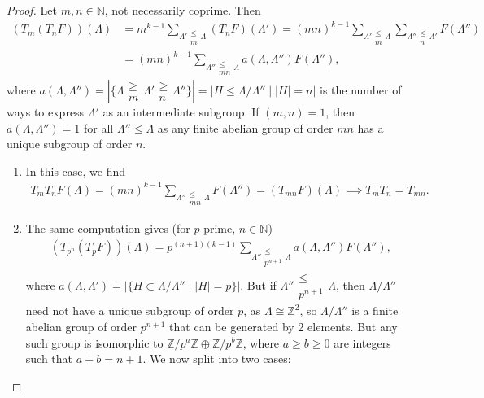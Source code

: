 \documentclass{article}
\theoremstyle{definition}
\begin{document}
\begin{proof}
    Let $m,n \in \mathbb{N}$, not necessarily coprime. Then 
    \begin{align*}
        (T_m(T_nF))(\Lambda) &= m^{k-1}\sum_{\Lambda' \substack{\le  \\ m} \Lambda}(T_nF)(\Lambda') = (mn)^{k-1}\sum_{\Lambda' \substack{\le  \\ m} \Lambda}\sum_{\Lambda'' \substack{\le  \\ n} \Lambda'} F(\Lambda'') \\
        &=(mn)^{k-1} \sum_{\Lambda'' \substack{\le  \\ mn} \Lambda}a(\Lambda,\Lambda'')F(\Lambda''),
    \end{align*}
    where $a(\Lambda, \Lambda'') = |\{\Lambda \substack{\ge \\ m} \Lambda' \substack{\ge \\ n} \Lambda''\}| = |H \le \Lambda/\Lambda'' \mid |H| = n|$ is the number of ways to express $\Lambda'$ as an intermediate subgroup. If $(m,n) = 1$, then $a(\Lambda,\Lambda'') = 1$ for all $\Lambda'' \le \Lambda$ as any finite abelian group of order $mn$ has a unique subgroup of order $n$.
    \begin{enumerate}[(1)]
        \item In this case, we find 
        \begin{align*}
            T_m T_nF(\Lambda) = (mn)^{k-1} \sum_{\Lambda'' \substack{\le  \\ mn} \Lambda} F(\Lambda'') = (T_{mn}F)(\Lambda) \implies T_mT_n = T_{mn}.
        \end{align*}
        \item The same computation gives (for $p$ prime, $n \in \mathbb{N}$)
        \begin{align*}
            (T_{p^n}(T_p F))(\Lambda) = p^{(n+1)(k-1)} \sum_{\Lambda'' \substack{\le  \\ p^{n+1}} \Lambda} a(\Lambda,\Lambda'')F(\Lambda''),
        \end{align*}
        where $a(\Lambda,\Lambda') = |\{H \subset \Lambda/\Lambda'' \mid |H| = p\}|$. But if $\Lambda'' \substack{\le \\ p^{n+1}} \Lambda$, then $\Lambda/\Lambda''$ need not have a unique subgroup of order $p$, as $\Lambda \cong \mathbb{Z}^2$, so $\Lambda/\Lambda''$ is a finite abelian group of order $p^{n+1}$ that can be generated by 2 elements. But any such group is isomorphic to $\mathbb{Z}/p^a\mathbb{Z} \oplus \mathbb{Z}/p^b \mathbb{Z}$, where $a\ge b\ge 0$ are integers such that $a + b = n + 1$. We now split into two cases:

\end{enumerate}
\end{proof}
\end{document}
